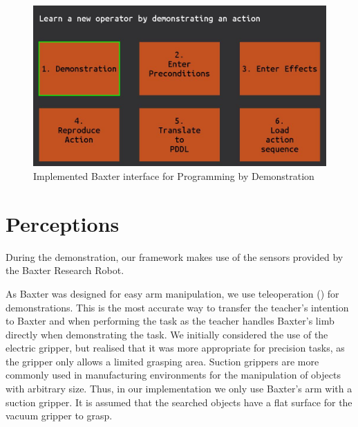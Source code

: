   \begin{figure}[h]
    \centering
    \includegraphics[scale=0.5]{figures/interface}
    \caption{Implemented Baxter interface for Programming by Demonstration}
    \label{fig:interface}
  \end{figure}





\section{Perceptions}
During the demonstration, our framework makes use of the sensors provided by the Baxter Research Robot.

As Baxter was designed for easy arm manipulation, we use teleoperation () for demonstrations.
This is the most accurate way to transfer the teacher's intention to Baxter and when performing the task as the teacher handles Baxter's limb directly when demonstrating the task.
We initially considered the use of the electric gripper, but realised that it was more appropriate for precision tasks, as the gripper only allows a limited grasping area.
Suction grippers are more commonly used in manufacturing environments for the manipulation of objects with arbitrary size.
Thus, in our implementation we only use Baxter's arm with a suction gripper.
It is assumed that the searched objects have a flat surface for the vacuum gripper to grasp.

